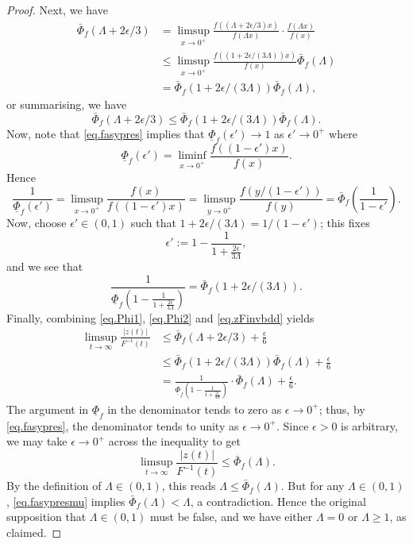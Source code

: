 \documentclass[a4paper,10pt,reqno]{amsart}
\numberwithin{equation}{section}
\theoremstyle{definition}
\theoremstyle{remark}
\DeclareMathOperator{\1}{\mathbbm 1}
\begin{document}
\begin{proof}
		Next, we have  
		\begin{align*}
			\bar{\Phi}_f(\Lambda+2\epsilon/3)&=
			\limsup_{x\to 0^+} \frac{f((\Lambda+2\epsilon/3)x)}{f(\Lambda x)}
			\cdot \frac{f(\Lambda x)}{f(x)}\\
			&\leq \limsup_{x\to 0^+} \frac{f((1+2\epsilon/(3\Lambda) )x)}{f(x)} \bar{\Phi}_f(\Lambda)\\
			&= \bar{\Phi}_f(1+2\epsilon/(3\Lambda))\bar{\Phi}_f(\Lambda),
		\end{align*}
		or summarising, we have 
		\begin{equation} \label{eq.Phi1}
			\bar{\Phi}_f(\Lambda+2\epsilon/3)\leq \bar{\Phi}_f(1+2\epsilon/(3\Lambda))\bar{\Phi}_f(\Lambda).
		\end{equation}
		Now, note that \eqref{eq.fasypres} implies that $\underline{\Phi}_f(\epsilon')\to 1$ as $\epsilon'\to 0^+$ where  
		\[
		\underline{\Phi}_f(\epsilon')=\liminf_{x\to 0^+} \frac{f((1-\epsilon')x)}{f(x)}.
		\]
		Hence
		\[
		\frac{1}{\underline{\Phi}_f(\epsilon')} %
		=\limsup_{x\to 0^+} \frac{f(x)}{f((1-\epsilon')x)}
		=\limsup_{y\to 0^+} \frac{f(y/(1-\epsilon'))}{f(y)}
		=\bar{\Phi}_f\left(\frac{1}{1-\epsilon'}\right).
		\] 
		Now, choose $\epsilon'\in (0,1)$ such that $1+2\epsilon/(3\Lambda)=1/(1-\epsilon')$; this fixes 
		\[
		\epsilon':=1-\frac{1}{1+\frac{2\epsilon}{3\Lambda}},
		\]
		and we see that 
		\begin{equation} \label{eq.Phi2}
			\frac{1}{\underline{\Phi}_f\left(1-\frac{1}{1+\frac{2\epsilon}{3\Lambda}}\right)}=\bar{\Phi}_f\left(1+2\epsilon/(3\Lambda)\right).
		\end{equation}
		Finally, combining \eqref{eq.Phi1}, \eqref{eq.Phi2} and 
		\eqref{eq.zFinvbdd} yields
		\begin{align*}
			\limsup_{t\to\infty} \frac{|z(t)|}{F^{-1}(t)}&\leq \bar{\Phi}_f(\Lambda+2\epsilon/3)+\frac{\epsilon}{6}\\
			&\leq \bar{\Phi}_f(1+2\epsilon/(3\Lambda))\bar{\Phi}_f(\Lambda)  + \frac{\epsilon}{6}\\
			&= \frac{1}{\underline{\Phi}_f\left(1-\frac{1}{1+\frac{2\epsilon}{3\Lambda}}\right)} \cdot \bar{\Phi}_f(\Lambda)  + \frac{\epsilon}{6}.
		\end{align*}
		The argument in $\underline{\Phi}_f$ in the denominator tends to zero as $\epsilon\to 0^+$; thus, by \eqref{eq.fasypres}, the denominator tends to unity as $\epsilon\to 0^+$. Since $\epsilon>0$ is arbitrary, we may take $\epsilon\to 0^+$ across the inequality to get 
		\[
		\limsup_{t\to\infty} \frac{|z(t)|}{F^{-1}(t)} \leq \bar{\Phi}_f(\Lambda).
		\]
		By the definition of $\Lambda\in (0,1)$, this reads $\Lambda\leq   \bar{\Phi}_f(\Lambda)$. But for any $\Lambda\in (0,1)$, \eqref{eq.fasypresmu} implies $\bar{\Phi}_f(\Lambda)<\Lambda$, a contradiction. Hence the original supposition that $\Lambda\in (0,1)$ must be false, and we have either $\Lambda=0$ or $\Lambda\geq 1$, as claimed. 
	\end{proof}
	
\end{document}
